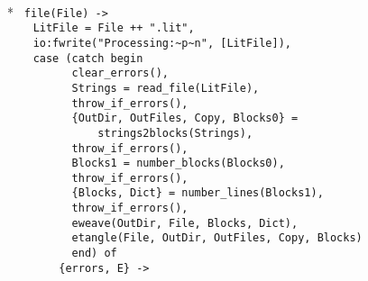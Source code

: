 \begin{flushleft}
\label{main_start}
\\*
\tt
\noindent{}%
\verb&file(File) ->&\\
\noindent{}%
\verb&    LitFile = File ++ ".lit",&\\
\noindent{}%
\verb&    io:fwrite("Processing:~p~n", [LitFile]),&\\
\noindent{}%
\verb&    case (catch begin&\\
\noindent{}%
\verb&          clear_errors(),&\\
\noindent{}%
\verb&          Strings = read_file(LitFile),&\\
\noindent{}%
\verb&          throw_if_errors(),&\\
\noindent{}%
\verb&          {OutDir, OutFiles, Copy, Blocks0} = &\\
\noindent{}%
\verb&              strings2blocks(Strings),&\\
\noindent{}%
\verb&          throw_if_errors(),&\\
\noindent{}%
\verb&          Blocks1 = number_blocks(Blocks0),&\\
\noindent{}%
\verb&          throw_if_errors(),&\\
\noindent{}%
\verb&          {Blocks, Dict} = number_lines(Blocks1),&\\
\noindent{}%
\verb&          throw_if_errors(),&\\
\noindent{}%
\verb&          eweave(OutDir, File, Blocks, Dict),&\\
\noindent{}%
\verb&          etangle(File, OutDir, OutFiles, Copy, Blocks)&\\
\noindent{}%
\verb&          end) of&\\
\noindent{}%
\verb&        {errors, E} ->&\\

\end{flushleft}
